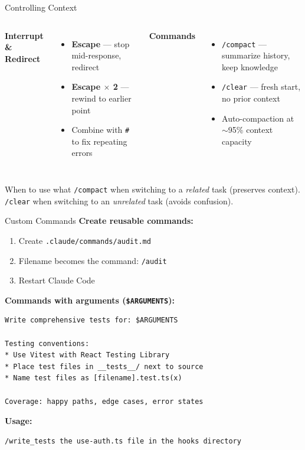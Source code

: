 \documentclass[aspectratio=169]{beamer}
\begin{document}
\begin{frame}{Controlling Context}
\begin{columns}[T]
\textbf{\color{popblue}Interrupt \& Redirect}
\begin{itemize}
  \item \textbf{Escape} --- stop mid-response, redirect
  \item \textbf{Escape $\times$ 2} --- rewind to earlier point
  \item Combine with \texttt{\#} to fix repeating errors
\end{itemize}

\textbf{\color{paramgreen}Commands}
\begin{itemize}
  \item \texttt{/compact} --- summarize history, keep knowledge
  \item \texttt{/clear} --- fresh start, no prior context
  \item Auto-compaction at $\sim$95\% context capacity
\end{itemize}
\end{columns}

\bigskip
\begin{alertblock}{When to use what}
\texttt{/compact} when switching to a \emph{related} task (preserves context). \\
\texttt{/clear} when switching to an \emph{unrelated} task (avoids confusion).
\end{alertblock}
\end{frame}

\begin{frame}[fragile]{Custom Commands}
\textbf{Create reusable commands:}
\begin{enumerate}
  \item Create \texttt{.claude/commands/audit.md}
  \item Filename becomes the command: \texttt{/audit}
  \item Restart Claude Code
\end{enumerate}

\bigskip
\textbf{Commands with arguments (\texttt{\$ARGUMENTS}):}
\begin{lstlisting}
Write comprehensive tests for: $ARGUMENTS

Testing conventions:
* Use Vitest with React Testing Library
* Place test files in __tests__/ next to source
* Name test files as [filename].test.ts(x)

Coverage: happy paths, edge cases, error states
\end{lstlisting}

\textbf{Usage:}
\begin{lstlisting}
/write_tests the use-auth.ts file in the hooks directory
\end{lstlisting}
\end{frame}
\end{document}
